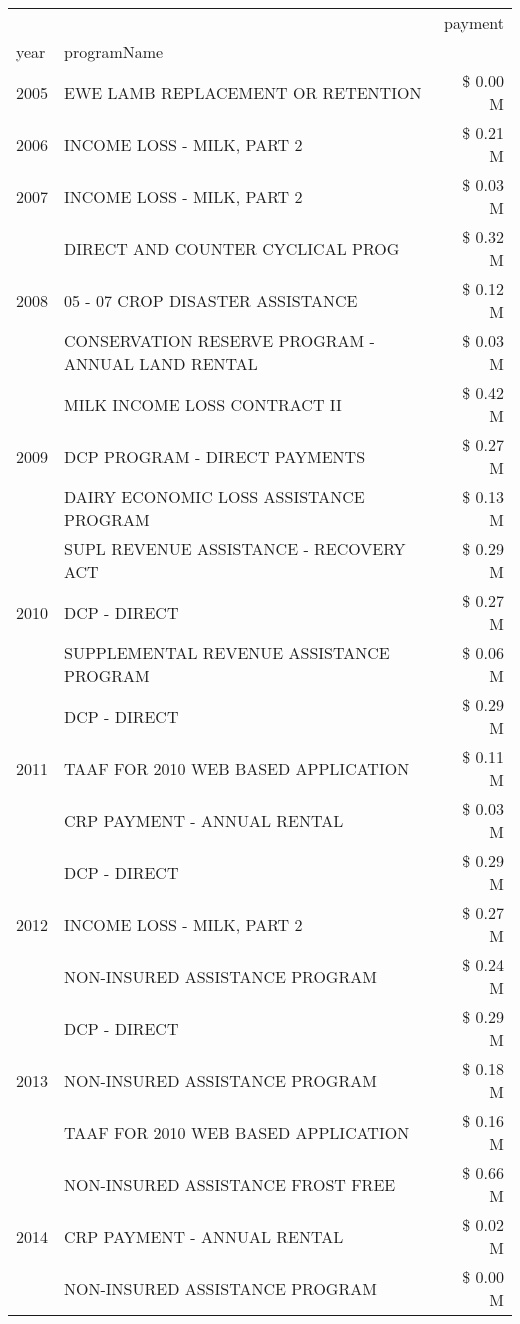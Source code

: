 \begin{tabular}{llr}
\toprule
 &  & payment \\
year & programName &  \\
\midrule
2005 & EWE LAMB REPLACEMENT OR RETENTION & \$ 0.00 M \\
\cline{1-3}
2006 & INCOME LOSS - MILK, PART 2 & \$ 0.21 M \\
\cline{1-3}
2007 & INCOME LOSS - MILK, PART 2 & \$ 0.03 M \\
\cline{1-3}
\multirow[t]{3}{*}{2008} & DIRECT AND COUNTER CYCLICAL PROG & \$ 0.32 M \\
 & 05 - 07 CROP DISASTER ASSISTANCE & \$ 0.12 M \\
 & CONSERVATION RESERVE PROGRAM - ANNUAL LAND RENTAL & \$ 0.03 M \\
\cline{1-3}
\multirow[t]{3}{*}{2009} & MILK INCOME LOSS CONTRACT II & \$ 0.42 M \\
 & DCP PROGRAM - DIRECT PAYMENTS & \$ 0.27 M \\
 & DAIRY ECONOMIC LOSS ASSISTANCE PROGRAM & \$ 0.13 M \\
\cline{1-3}
\multirow[t]{3}{*}{2010} & SUPL REVENUE ASSISTANCE - RECOVERY ACT & \$ 0.29 M \\
 & DCP - DIRECT & \$ 0.27 M \\
 & SUPPLEMENTAL REVENUE ASSISTANCE PROGRAM & \$ 0.06 M \\
\cline{1-3}
\multirow[t]{3}{*}{2011} & DCP - DIRECT & \$ 0.29 M \\
 & TAAF FOR 2010 WEB BASED APPLICATION & \$ 0.11 M \\
 & CRP PAYMENT - ANNUAL RENTAL & \$ 0.03 M \\
\cline{1-3}
\multirow[t]{3}{*}{2012} & DCP - DIRECT & \$ 0.29 M \\
 & INCOME LOSS - MILK, PART 2 & \$ 0.27 M \\
 & NON-INSURED ASSISTANCE PROGRAM & \$ 0.24 M \\
\cline{1-3}
\multirow[t]{3}{*}{2013} & DCP - DIRECT & \$ 0.29 M \\
 & NON-INSURED ASSISTANCE PROGRAM & \$ 0.18 M \\
 & TAAF FOR 2010 WEB BASED APPLICATION & \$ 0.16 M \\
\cline{1-3}
\multirow[t]{3}{*}{2014} & NON-INSURED ASSISTANCE FROST FREE & \$ 0.66 M \\
 & CRP PAYMENT - ANNUAL RENTAL & \$ 0.02 M \\
 & NON-INSURED ASSISTANCE PROGRAM & \$ 0.00 M \\
\cline{1-3}

\end{tabular}
